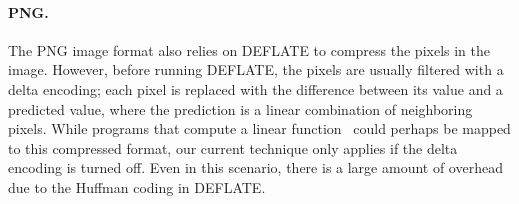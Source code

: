 \paragraph{PNG.}
The PNG image format also relies on DEFLATE to compress the pixels in
the image.  However, before running DEFLATE, the pixels are usually
filtered with a delta encoding; each pixel is replaced with the
difference between its value and a predicted value, where the
prediction is a linear combination of neighboring pixels.  While
programs that compute a linear function~\cite{aalamb} could perhaps be
mapped to this compressed format, our current technique only applies
if the delta encoding is turned off.  Even in this scenario, there is
a large amount of overhead due to the Huffman coding in DEFLATE.
